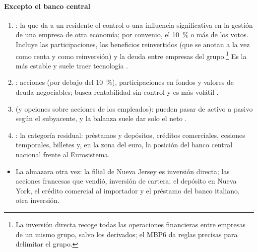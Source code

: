 \documentclass[11pt]{article}
\begin{document}
\paragraph{Excepto el banco central}
\begin{enumerate}
\item {}: la que da a un residente el control o una influencia significativa en la gestión de una empresa de otra economía; por convenio, el 10~\% o más de los votos\nocite{FMI2009MBP6}. Incluye las participaciones, los beneficios reinvertidos (que se anotan a la vez como renta y como reinversión) y la deuda entre empresas del grupo.\footnote{La inversión directa recoge todas las operaciones financieras entre empresas de un mismo grupo, salvo los derivados; el MBP6 da reglas precisas para delimitar el grupo.} Es la más estable y suele traer tecnología .
\item {}: acciones (por debajo del 10~\%), participaciones en fondos y valores de deuda negociables; busca rentabilidad sin control y es más volátil .
\item {} (y opciones sobre acciones de los empleados): pueden pasar de activo a pasivo según el subyacente, y la balanza suele dar solo el neto .
\item {}: la categoría residual: préstamos y depósitos, créditos comerciales, cesiones temporales, billetes y, en la zona del euro, la posición del banco central nacional frente al Eurosistema.
\end{enumerate}

\begin{itemize}
\item La almazara otra vez: la filial de Nueva Jersey es inversión directa; las acciones francesas que vendió, inversión de cartera; el depósito en Nueva York, el crédito comercial al importador y el préstamo del banco italiano, otra inversión.
\end{itemize}
\end{document}
